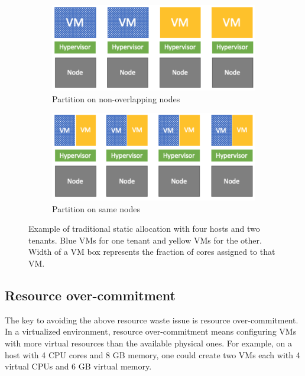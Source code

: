 \begin{figure}
     \centering
     \begin{subfigure}[b]{0.45\textwidth}
         \centering
         \includegraphics[width=\textwidth]{Figures/allocation1.pdf}
         \caption{Partition on non-overlapping nodes}
         \label{fig:allocation1}
     \end{subfigure}
     \hfill
     \begin{subfigure}[b]{0.45\textwidth}
         \centering
         \includegraphics[width=\textwidth]{Figures/allocation2.pdf}
         \caption{Partition on same nodes}
         \label{fig:allocation2}
     \end{subfigure}
     \caption{Example of traditional static allocation with four hosts and two tenants. Blue VMs for one tenant and yellow VMs for the other. Width of a VM box represents
     the fraction of cores assigned to that VM.}
     \label{fig:static_allo}
\end{figure}

\subsection{Resource over-commitment}
The key to avoiding the above resource waste issue is resource over-commitment. In a 
virtualized environment, resource over-commitment means configuring VMs with more virtual resources than the available 
physical ones. For example, on a host with 4 CPU cores and 8 GB memory, one could create two VMs each 
with 4 virtual CPUs and 6 GB virtual memory. 


